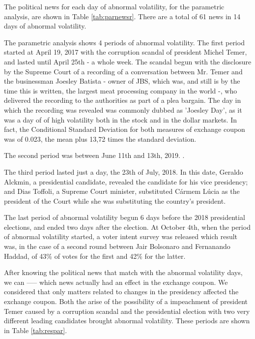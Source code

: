 \documentclass[a4paper]{article}
\begin{document}
The political news for each day of abnormal volatility, for the parametric analysis, are shown in Table \ref{tab:parnewsr}. There are a total of 61 news in 14 days of abnormal volatility.



The parametric analysis shows 4 periods of abnormal volatility. The first period started at April 19, 2017 with the corruption scandal of president Michel Temer, and lasted until April 25th - a whole week. The scandal begun with the disclosure by the Supreme Court of a recording of a conversation between Mr. Temer and the businessman Joesley Batista - owner of JBS, which was, and still is by the time this is written, the largest meat processing company in the world -, who delivered the recording to the authorities as part of a plea bargain. The day in which the recording was revealed was commonly dubbed as 'Joesley Day', as it was a day of of high volatility both in the stock and in the dollar markets. In fact, the Conditional Standard Deviation for both measures of exchange coupon was of 0.023, the mean plus 13,72 times the standard deviation.

The second period was between June 11th and 13th, 2019. .

The third period lasted just a day, the 23th of July, 2018. In this date, Geraldo Alckmin, a presidential candidate, revealed the candidate for his vice presidency; and Dias Toffoli, a Supreme Court minister, substituted Cármem Lúcia as the president of the Court while she was substituting the country's president.

The last period of abnormal volatility begun 6 days before the 2018 presidential elections, and ended two days after the election. At October 4th, when the period of abnormal volatility started, a voter intent survey was released which result was, in the case of a second round between Jair Bolsonaro and Fernanando Haddad, of 43\% of votes for the first and 42\% for the latter. 

After knowing the political news that match with the abnormal volatility days, we can ----- which news actually had an effect in the exchange coupon. We considered that only matters related to changes in the presidency affected the exchange coupon. Both the arise of the possibility of a impeachment of president Temer caused by a corruption scandal and the presidential election with two very different  leading candidates brought abnormal volatility. These periods are shown in Table \ref{tab:respar}.
\end{document}
